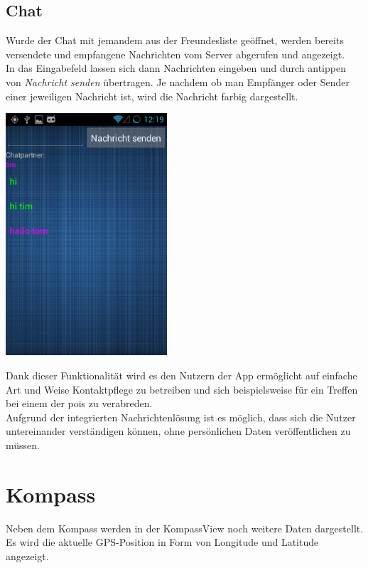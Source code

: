 \subsection{Chat}
Wurde der Chat mit jemandem aus der Freundesliste geöffnet, werden bereits versendete und empfangene Nachrichten vom Server abgerufen und angezeigt.\\
In das Eingabefeld lassen sich dann Nachrichten eingeben und durch antippen von \textit{Nachricht senden} übertragen. Je nachdem ob man Empfänger oder Sender einer jeweiligen Nachricht ist, wird die Nachricht farbig dargestellt.
\begin{capfigure}
	\includegraphics[width=6cm]{images/app/chat}
\end{capfigure}
Dank dieser Funktionalität wird es den Nutzern der App ermöglicht auf einfache Art und Weise Kontaktpflege zu betreiben und sich beispielsweise für ein Treffen bei einem der \glspl{poi} zu verabreden.\\
Aufgrund der integrierten Nachrichtenlösung ist es möglich, dass sich die Nutzer untereinander verständigen können, ohne persönlichen Daten veröffentlichen zu müssen.
\clearpage
\section{Kompass}
Neben dem Kompass werden in der KompassView noch weitere Daten dargestellt. Es wird die aktuelle GPS-Position in Form von Longitude und Latitude angezeigt.

